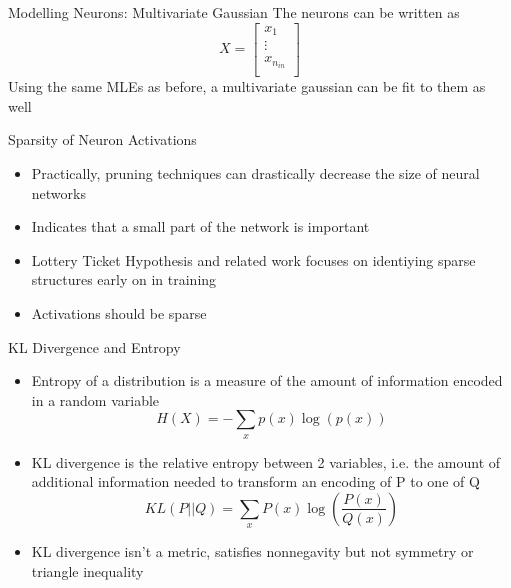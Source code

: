 \documentclass{beamer}
\begin{document}
    \begin{frame}{Modelling Neurons: Multivariate Gaussian}
        The neurons can be written as  
        \[X = 
        \begin{bmatrix}
            x_1 \\
            \vdots \\
            x_{n_{in}} \\
        \end{bmatrix}
        \]
        Using the same MLEs as before, a multivariate gaussian can be fit to them as well
    \end{frame}

    \begin{frame}{Sparsity of Neuron Activations}
        \begin{itemize}
            \setlength\itemsep{1em}
            \item 
                Practically, pruning techniques can drastically decrease the size of neural networks
            \item 
                Indicates that a small part of the network is important
            \item 
                Lottery Ticket Hypothesis and related work focuses on identiying sparse structures early on in training
            \item 
                Activations should be sparse
        \end{itemize}
    \end{frame}


    \begin{frame}{KL Divergence and Entropy}
        \begin{itemize}
            \setlength\itemsep{1em}
            \item 
                Entropy of a distribution is a measure of the amount of information encoded in a random variable
                \[H(X) = -\sum_x p(x)\log(p(x))\]
            \item 
                KL divergence is the relative entropy between 2 variables, i.e. the amount of additional information needed to transform an encoding of P to one of Q
                \[KL(P||Q) = \sum_x P(x)\log(\frac{P(x)}{Q(x)})\]
            \item 
                KL divergence isn't a metric, satisfies nonnegavity but not symmetry or triangle inequality
        \end{itemize}
    \end{frame}
\end{document}
